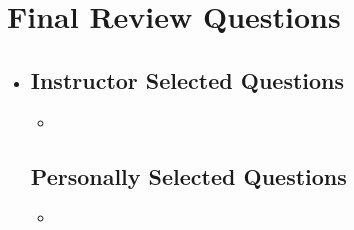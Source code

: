 \section{Final Review Questions}
\begin{itemize}
  \item[]

  \subsection{Instructor Selected Questions}
  \begin{itemize}
    \item
  \end{itemize}


  \subsection{Personally Selected Questions}
  \begin{itemize}
    \item
  \end{itemize}

\end{itemize}
